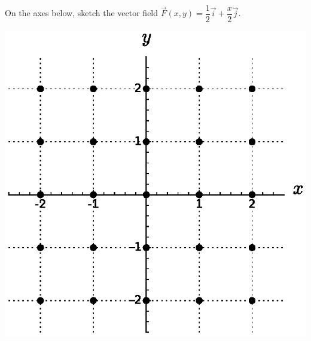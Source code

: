 \vfill 

\begin{ex}
    On the axes below, sketch the vector field   $\vec{F}(x,y)=\dfrac{1}{2}\vec{i}+\dfrac{x}{2}\vec{j}$.

    \includegraphics[width=.5\textwidth]{images/dots_more}
\end{ex}

\pagebreak 

